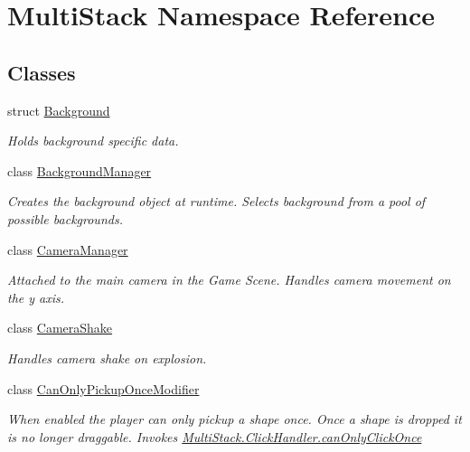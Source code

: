 \hypertarget{namespace_multi_stack}{}\section{Multi\+Stack Namespace Reference}
\label{namespace_multi_stack}
\subsection*{Classes}
\begin{DoxyCompactItemize}
\item 
struct \hyperlink{struct_multi_stack_1_1_background}{Background}
\begin{DoxyCompactList}\small\item\em Holds background specific data. \end{DoxyCompactList}\item 
class \hyperlink{class_multi_stack_1_1_background_manager}{Background\+Manager}
\begin{DoxyCompactList}\small\item\em Creates the background object at runtime. Selects background from a pool of possible backgrounds. \end{DoxyCompactList}\item 
class \hyperlink{class_multi_stack_1_1_camera_manager}{Camera\+Manager}
\begin{DoxyCompactList}\small\item\em Attached to the main camera in the Game Scene. Handles camera movement on the y axis. \end{DoxyCompactList}\item 
class \hyperlink{class_multi_stack_1_1_camera_shake}{Camera\+Shake}
\begin{DoxyCompactList}\small\item\em Handles camera shake on explosion. \end{DoxyCompactList}\item 
class \hyperlink{class_multi_stack_1_1_can_only_pickup_once_modifier}{Can\+Only\+Pickup\+Once\+Modifier}
\begin{DoxyCompactList}\small\item\em When enabled the player can only pickup a shape once. Once a shape is dropped it is no longer draggable. Invokes \hyperlink{class_multi_stack_1_1_click_handler_ab7cdf9c5b65265b0f17437ee6313fbeb}{Multi\+Stack.\+Click\+Handler.\+can\+Only\+Click\+Once} \end{DoxyCompactList}\item 

\end{DoxyCompactItemize}
